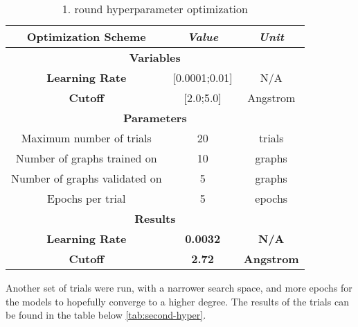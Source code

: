 \begin{table}[H]
    \centering
    \caption{1. round hyperparameter optimization}
    \label{tab:first-hyper}
    \begin{tabular}{|ccc|}
        \hline
        \multicolumn{1}{|c|}{\textbf{Optimization Scheme}}  & \multicolumn{1}{c|}{\textit{\textbf{Value}}} & \textit{\textbf{Unit}} \\ \hline
        \multicolumn{3}{|c|}{\textbf{Variables}}                                                                                    \\ \hline
        \multicolumn{1}{|c|}{\textbf{Learning Rate}}        & \multicolumn{1}{c|}{{[}0.0001;0.01{]}}       & N/A                    \\ \hline
        \multicolumn{1}{|c|}{\textbf{Cutoff}}               & \multicolumn{1}{c|}{{[}2.0;5.0{]}}           & Angstrom               \\ \hline
        \multicolumn{3}{|c|}{\textbf{Parameters}}                                                                                   \\ \hline
        \multicolumn{1}{|c|}{Maximum number of trials}      & \multicolumn{1}{c|}{20}                      & trials                 \\ \hline
        \multicolumn{1}{|c|}{Number of graphs trained on}   & \multicolumn{1}{c|}{10}                      & graphs                 \\ \hline
        \multicolumn{1}{|c|}{Number of graphs validated on} & \multicolumn{1}{c|}{5}                       & graphs                 \\ \hline
        \multicolumn{1}{|c|}{Epochs per trial}              & \multicolumn{1}{c|}{5}                       & epochs                 \\ \hline
        \multicolumn{3}{|c|}{\textbf{Results}}                                                                                      \\ \hline
        \multicolumn{1}{|c|}{\textbf{Learning Rate}}        & \multicolumn{1}{c|}{\textbf{0.0032}}         & \textbf{N/A}           \\ \hline
        \multicolumn{1}{|c|}{\textbf{Cutoff}}               & \multicolumn{1}{c|}{\textbf{2.72}}           & \textbf{Angstrom}      \\ \hline
    \end{tabular}
\end{table}

Another set of trials were run, with a narrower search space, and more epochs for the models to hopefully converge to a higher degree.
The results of the trials can be found in the table below \ref{tab:second-hyper}.

